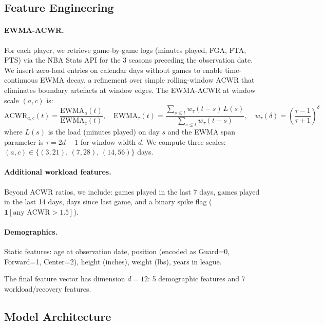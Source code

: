 \documentclass{article}
\begin{document}
\subsection{Feature Engineering}
\label{sec:features}

\paragraph{EWMA-ACWR.}
For each player, we retrieve game-by-game logs (minutes played, FGA, FTA, PTS)
via the NBA Stats API for the 3 seasons preceding the observation date.  We
insert zero-load entries on calendar days without games to enable
time-continuous EWMA decay, a refinement over simple rolling-window ACWR that
eliminates boundary artefacts at window edges.  The EWMA-ACWR at window scale
$(a, c)$ is:
\begin{equation}
  \text{ACWR}_{a,c}(t) = \frac{\text{EWMA}_a(t)}{\text{EWMA}_c(t)},
  \quad
  \text{EWMA}_{\tau}(t) = \frac{\sum_{s \leq t} w_{\tau}(t-s)\,L(s)}
                               {\sum_{s \leq t} w_{\tau}(t-s)},
  \quad
  w_{\tau}(\delta) = \left(\frac{\tau-1}{\tau+1}\right)^{\!\delta}
  \label{eq:ewma}
\end{equation}
where $L(s)$ is the load (minutes played) on day $s$ and the EWMA span
parameter is $\tau = 2d - 1$ for window width $d$.  We compute three scales:
$(a, c) \in \{(3,21),\,(7,28),\,(14,56)\}$ days.

\paragraph{Additional workload features.}
Beyond ACWR ratios, we include: games played in the last 7 days, games played
in the last 14 days, days since last game, and a binary spike flag
($\mathbf{1}[\text{any ACWR} > 1.5]$).

\paragraph{Demographics.}
Static features: age at observation date, position (encoded as Guard=0,
Forward=1, Center=2), height (inches), weight (lbs), years in league.

The final feature vector has dimension $d = 12$: 5 demographic features and
7 workload/recovery features.

\subsection{Model Architecture}
\label{sec:model}
\end{document}
